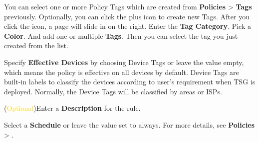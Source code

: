 \begin{description}
    
    You can select one or more Policy Tags which are created from \textbf{Policies} > \textbf{Tags} previously. Optionally, you can click the plus icon to create new Tags. After you click the icon, a page will slide in on the right. Enter the \textbf{Tag Category}. Pick a \textbf{Color}. And add one or multiple \textbf{Tags}. Then you can select the tag you just created from the list.
    \item[STEP 8.]	Specify \textbf{Effective Devices} by choosing Device Tags or leave the value empty, which means the policy is effective on all devices by default. Device Tags are built-in labels to classify the devices according to user’s requirement when TSG is deployed. Normally, the Device Tags will be classified by areas or ISPs.
    \item[STEP 9.]	(\textcolor{gold}{Optional})Enter a \textbf{Description} for the rule.
    \item[STEP 10.]	Select a \textbf{Schedule} or leave the value set to always. For more details, see \textbf{Policies} > \textbf{\hyperlink{link:Schedules}{\color{linkblue}{Schedules}}}.



\end{description}
